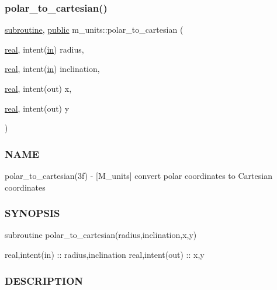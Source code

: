 \mbox{\label{namespacem__units_aa8b818c6ad24272b8c946b497041edc9}} 
\subsubsection{\texorpdfstring{polar\+\_\+to\+\_\+cartesian()}{polar\_to\_cartesian()}}
{\footnotesize\ttfamily \hyperlink{M__stopwatch_83_8txt_acfbcff50169d691ff02d4a123ed70482}{subroutine}, \hyperlink{M__stopwatch_83_8txt_a2f74811300c361e53b430611a7d1769f}{public} m\+\_\+units\+::polar\+\_\+to\+\_\+cartesian (\begin{DoxyParamCaption}\item[{\hyperlink{read__watch_83_8txt_abdb62bde002f38ef75f810d3a905a823}{real}, intent(\hyperlink{M__journal_83_8txt_afce72651d1eed785a2132bee863b2f38}{in})}]{radius,  }\item[{\hyperlink{read__watch_83_8txt_abdb62bde002f38ef75f810d3a905a823}{real}, intent(\hyperlink{M__journal_83_8txt_afce72651d1eed785a2132bee863b2f38}{in})}]{inclination,  }\item[{\hyperlink{read__watch_83_8txt_abdb62bde002f38ef75f810d3a905a823}{real}, intent(out)}]{x,  }\item[{\hyperlink{read__watch_83_8txt_abdb62bde002f38ef75f810d3a905a823}{real}, intent(out)}]{y }\end{DoxyParamCaption})}



\subsubsection*{N\+A\+ME}

polar\+\_\+to\+\_\+cartesian(3f) -\/ \mbox{[}M\+\_\+units\mbox{]} convert polar coordinates to Cartesian coordinates \subsubsection*{S\+Y\+N\+O\+P\+S\+IS}

subroutine polar\+\_\+to\+\_\+cartesian(radius,inclination,x,y)

real,intent(in) \+:\+: radius,inclination real,intent(out) \+:\+: x,y

\subsubsection*{D\+E\+S\+C\+R\+I\+P\+T\+I\+ON}

